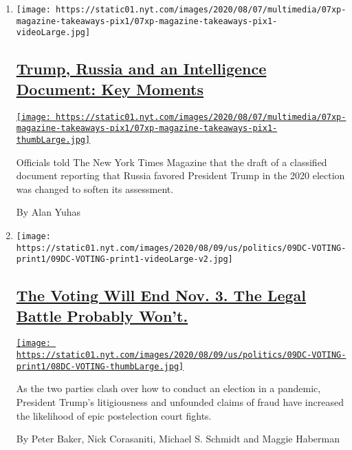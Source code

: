 \begin{enumerate}
\def\labelenumi{\arabic{enumi}.}
\item
  \texttt{[image: https://static01.nyt.com/images/2020/08/07/multimedia/07xp-magazine-takeaways-pix1/07xp-magazine-takeaways-pix1-videoLarge.jpg]}

  \hypertarget{trump-russia-and-an-intelligence-document-key-moments}{%
  \subsection{\texorpdfstring{\href{/2020/08/08/us/politics/trump-russia.html}{Trump,
  Russia and an Intelligence Document: Key
  Moments}}{Trump, Russia and an Intelligence Document: Key Moments}}\label{trump-russia-and-an-intelligence-document-key-moments}}

  \href{/2020/08/08/us/politics/trump-russia.html}{\texttt{[image: https://static01.nyt.com/images/2020/08/07/multimedia/07xp-magazine-takeaways-pix1/07xp-magazine-takeaways-pix1-thumbLarge.jpg]}}

  Officials told The New York Times Magazine that the draft of a
  classified document reporting that Russia favored President Trump in
  the 2020 election was changed to soften its assessment.

  By Alan Yuhas
\item
  \texttt{[image: https://static01.nyt.com/images/2020/08/09/us/politics/09DC-VOTING-print1/09DC-VOTING-print1-videoLarge-v2.jpg]}

  \hypertarget{the-voting-will-end-nov-3-the-legal-battle-probably-wont}{%
  \subsection{\texorpdfstring{\href{/2020/08/08/us/politics/voting-nov-3-election.html}{The
  Voting Will End Nov. 3. The Legal Battle Probably
  Won't.}}{The Voting Will End Nov. 3. The Legal Battle Probably Won't.}}\label{the-voting-will-end-nov-3-the-legal-battle-probably-wont}}

  \href{/2020/08/08/us/politics/voting-nov-3-election.html}{\texttt{[image: https://static01.nyt.com/images/2020/08/09/us/politics/09DC-VOTING-print1/08DC-VOTING-thumbLarge.jpg]}}

  As the two parties clash over how to conduct an election in a
  pandemic, President Trump's litigiousness and unfounded claims of
  fraud have increased the likelihood of epic postelection court fights.

  By Peter Baker, Nick Corasaniti, Michael S. Schmidt and Maggie
  Haberman
\end{enumerate}

